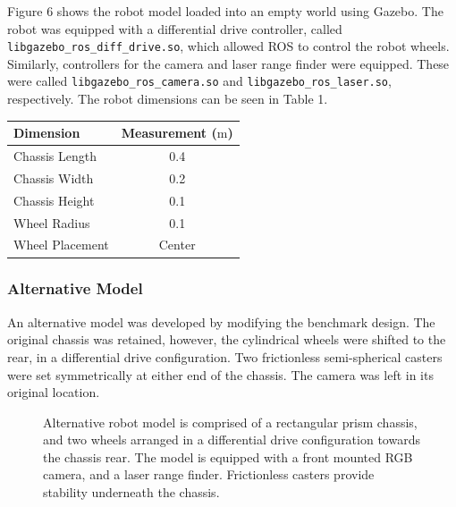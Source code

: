 \documentclass[a4paper]{article}
\begin{document}
\begin{minipage}{0.45\textwidth}
Figure 6 shows the robot model loaded into an empty world using Gazebo. The robot was equipped with a differential drive controller, called \texttt{libgazebo\_ros\_diff\_drive.so}, which allowed ROS to control the robot wheels. Similarly, controllers for the camera and laser range finder were equipped. These were called \texttt{libgazebo\_ros\_camera.so} and \texttt{libgazebo\_ros\_laser.so}, respectively. The robot dimensions can be seen in Table 1.
\end{minipage}
\hspace{1cm}
\begin{minipage}{0.45\textwidth}
\centering
{}
\begin{tabular}{lc}
\toprule
\textbf{Dimension} & \textbf{Measurement ($\si{\meter}$)} \\
\midrule
Chassis Length & 0.4\\
Chassis Width & 0.2\\
Chassis Height & 0.1\\
Wheel Radius & 0.1\\
Wheel Placement & Center\\
\bottomrule
\end{tabular}
\end{minipage}


\subsubsection{Alternative Model}
An alternative model was developed by modifying the benchmark design. The original chassis was retained, however, the cylindrical wheels were shifted to the rear, in a differential drive configuration. Two frictionless semi-spherical casters were set symmetrically at either end of the chassis. The camera was left in its original location.
\begin{figure}[h]
\centering
{}
\caption{Alternative robot model is comprised of a rectangular prism chassis, and two wheels arranged in a differential drive configuration towards the chassis rear. The model is equipped with a front mounted RGB camera, and a laser range finder. Frictionless casters provide stability underneath the chassis.}
\end{figure}
\end{document}
